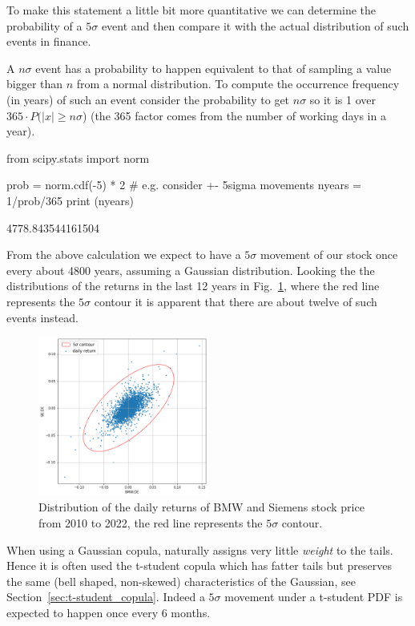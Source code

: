 To make this statement a little bit more quantitative we can determine the probability of a $5\sigma$ event and then compare it with the actual distribution of such events in finance.

\begin{attention}
A $n\sigma$ event has a probability to happen equivalent to that of sampling a value bigger than $n$ from a normal distribution.
To compute the occurrence frequency (in years) of such an event consider the probability to get $n\sigma$ so it is 1 over $365\cdot P(|x| \ge n\sigma$) (the 365 factor comes from the number of working days in a year).

\begin{attpython}
from scipy.stats import norm

prob = norm.cdf(-5) * 2 # e.g. consider +- 5sigma movements
nyears = 1/prob/365
print (nyears)
\end{attpython}
\begin{ioutput}
4778.843544161504
\end{ioutput}
\noindent
\end{attention}

From the above calculation we expect to have a $5\sigma$ movement of our stock once every about 4800 years, assuming a Gaussian distribution. Looking the the distributions of the returns in the last 12 years in Fig.~\ref{fig:5sigma_contour}, where the red line represents the $5\sigma$ contour it is apparent that there are about twelve of such events instead.

\begin{figure}[htbp]
\centering
\includegraphics[width=0.5\textwidth]{figures/5_sigma_contour}
\caption{Distribution of the daily returns of BMW and Siemens stock price from 2010 to 2022, the red line represents the $5\sigma$ contour.}
\label{fig:5sigma_contour}
\end{figure}

When using a Gaussian copula, naturally assigns very little \emph{weight} to the tails. Hence it is often used the t-student copula  
which has fatter tails but preserves the same (bell shaped, non-skewed) characteristics of the Gaussian, see Section~\ref{sec:t-student_copula}.
Indeed a $5\sigma$ movement under a t-student PDF is expected to happen once every 6 months. 


